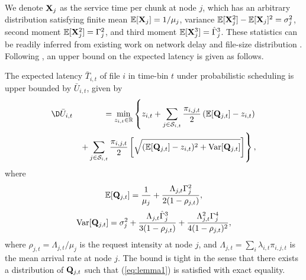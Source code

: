 
We denote ${\bf X}_j$ as the service time per chunk at node $j$, which has an arbitrary distribution satisfying finite mean $\mathbb{E}[{\bf X}_j]=1/\mu_j$, variance $\mathbb{E}[{\bf X}_j^2]-\mathbb{E}[{\bf X}_j]^2=\sigma^2_j$, second moment $\mathbb{E}[{\bf X}_j^2]=\Gamma_j^2$, and third moment $\mathbb{E}[{\bf X}_j^3]=\hat{\Gamma}^3_j$. These statistics can be readily inferred from existing work on network delay \cite{AY11,WK} and file-size distribution \cite{D11,PT12}. Following \cite{Yu_TON}, an upper bound on the expected latency is given as follows.

\begin{lemma} \label{th:lemma_1}
The expected latency $\bar{T}_{i,t}$ of file $i$    in time-bin $t$ under probabilistic scheduling is upper bounded by $\bar{U}_{i,t}$, given by
\vspace{-.1in}
\begin{eqnarray}
\D & \bar{U}_{i,t} & = \min_{z_{i,t}\in \mathbb{R}} \left\{ z_{i,t}+\sum_{j\in \mathcal{S}_{i,t}} \frac{\pi_{i,j,t}}{2}  \left(\mathbb{E}[{\bf Q}_{j,t}] -z_{i,t} \right) \right.  \label{eq:lemma1} \nonumber\\
& & \left.+ \sum_{j\in \mathcal{S}_{i,t}} \frac{\pi_{i,j,t}}{2} \left[ \sqrt{(\mathbb{E}[{\bf Q}_{j,t}]-z_{i,t})^2+{\rm Var}[{\bf Q}_{j,t}]}\right] \right\},
\end{eqnarray}
where
\vspace{-.2in}\begin{eqnarray}
\mathbb{E}[  {\bf Q}_{j,t}] =  \frac{1}{\mu_j} + \frac{ \Lambda_{j,t} \Gamma_j^2 }{2(1- \rho_{j,t})}, \label{eq:lemma2_1}
\end{eqnarray}
\vspace{-0.2in}
\begin{eqnarray}
{\rm Var}[ {\bf Q}_{j,t}] =\sigma_j^2+\frac{ \Lambda_{j,t} \hat{\Gamma}_j^3}{3(1-\rho_{j,t})}+\frac{\Lambda_{j,t}^2\Gamma_j^4}{4(1- \rho_{j,t})^2} , \label{eq:lemma2_2}
\end{eqnarray}
where $\rho_{j,t}=\Lambda_{j,t} / \mu_j$ is the request intensity at node $j$, and $\Lambda_{j,t}=\sum_i \lambda_{i,t}\pi_{i,j,t}$ is the mean arrival rate at node $j$.
The bound is tight in the sense that there exists a distribution of ${\bf Q}_{j,t}$ such that (\ref{eq:lemma1}) is satisfied with exact equality.
\end{lemma}



